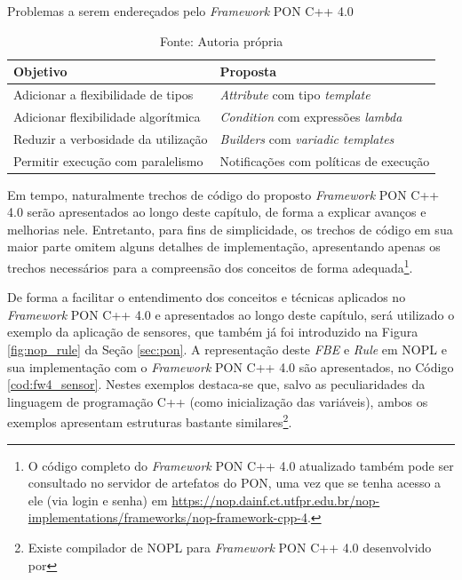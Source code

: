 \begin{table}[!htb]
\centering
\caption{Problemas a serem endereçados pelo \textit{Framework} PON C++ 4.0}
\caption*{Fonte: Autoria própria}
\label{tab:obj_fw4}
\smallskip
\begin{tabularx}{\textwidth}{|l|X|}\hline
    Objetivo & Proposta   \\\hline\hline
    Adicionar a flexibilidade de tipos & \textit{Attribute} com tipo \textit{template} \\ \hline
    Adicionar flexibilidade algorítmica & \textit{Condition} com expressões \textit{lambda} \\ \hline
    Reduzir a verbosidade da utilização & \textit{Builders} com \textit{variadic templates} \\ \hline
    Permitir execução com paralelismo & Notificações com políticas de execução \\ \hline
\end{tabularx}
\end{table}

Em tempo, naturalmente trechos de código do proposto \textit{Framework} PON C++
4.0 serão apresentados ao longo deste capítulo, de forma a explicar avanços e
melhorias nele. Entretanto, para fins de simplicidade, os trechos de código em
sua maior parte omitem alguns detalhes de implementação, apresentando apenas os
trechos necessários para a compreensão dos conceitos de forma
adequada\footnote{O código completo do \textit{Framework} PON C++ 4.0 atualizado
também pode ser consultado no servidor de artefatos do PON, uma vez que se tenha
acesso a ele (via login e senha) em
\url{https://nop.dainf.ct.utfpr.edu.br/nop-implementations/frameworks/nop-framework-cpp-4}.}.

De forma a facilitar o entendimento dos conceitos e técnicas aplicados no
\textit{Framework} PON C++ 4.0 e apresentados ao longo deste capítulo, será
utilizado o exemplo da aplicação de sensores, que também já foi introduzido na
Figura \ref{fig:nop_rule} da Seção \ref{sec:pon}. A representação deste
\textit{FBE} e \textit{Rule} em NOPL e sua implementação com o
\textit{Framework} PON C++ 4.0 são apresentados, no Código \ref{cod:fw4_sensor}.
Nestes exemplos destaca-se que,
salvo as peculiaridades da linguagem de programação C++ (como inicialização das
variáveis), ambos os exemplos apresentam estruturas bastante
similares\footnote{Existe compilador de NOPL para \textit{Framework} PON C++
4.0 desenvolvido por }.

